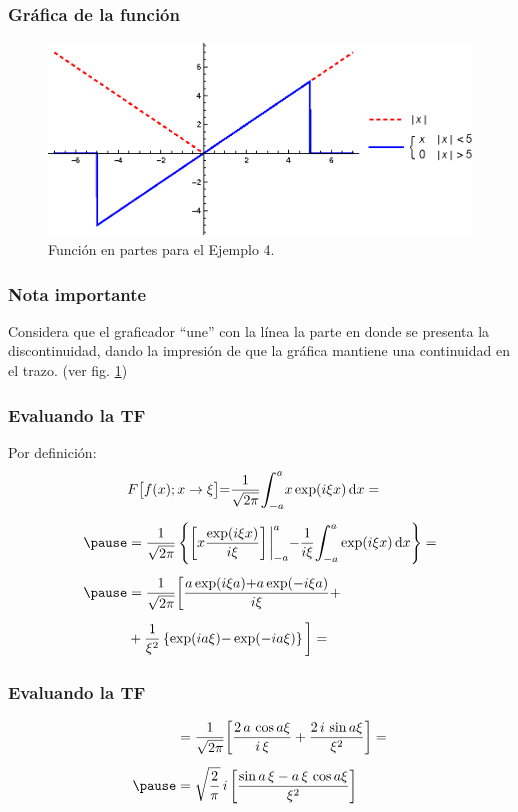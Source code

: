 \begin{frame}
\frametitle{Gráfica de la función}
\begin{figure}[H]
    \centering
    \includegraphics[scale=0.8]{Imagenes/Plot_Ejemplo_04_01.eps}
    \caption{Función en partes para el Ejemplo 4.}
    \label{fig:figura_plot_Ejemplo_04_01}
\end{figure}
\end{frame}
\begin{frame}
\frametitle{Nota importante}
Considera que el graficador \enquote{une} con la línea la parte en donde se presenta la discontinuidad, dando la impresión de que la gráfica mantiene una continuidad en el trazo. (ver fig. \ref{fig:figura_plot_Ejemplo_04_01})
\end{frame}
\begin{frame}
\frametitle{Evaluando la TF}
Por definición:
\pause
\begin{eqnarray*}
\begin{aligned}
&F \big[ f (x); x \to \xi \big] {=} \dfrac{1}{\sqrt{2 \pi}} \scaleint{6ex}_{\bs -a}^{a} x \exp(i \xi x) \dd{x} = \\[0.5em] \pause
&= \dfrac{1}{\sqrt{2 \pi}} \left\{ \bigg[ x \dfrac{\exp(i \xi x)}{i \xi} \bigg] \eval_{-a}^{a} {-} \dfrac{1}{i \xi} \scaleint{6ex}_{\bs -a}^{a} \exp(i \xi x) \dd{x} \right\} = \\[0.5em] \pause
&= \dfrac{1}{\sqrt{2 \pi}} \bigg[ \dfrac{a \exp(i \xi a) {+} a \exp(-i \xi a)}{i \xi} {+} \\[0.5em] 
&+ \dfrac{1}{\xi^{2}} \left\{ \exp(i a \xi) {-} \exp(-i a \xi) \right\} \bigg] =
\end{aligned}
\end{eqnarray*}
\end{frame}
\begin{frame}
\frametitle{Evaluando la TF}
\begin{eqnarray*}
\begin{aligned}
&= \dfrac{1}{\sqrt{2 \pi}} \bigg[ \dfrac{2 \, a \, \cos a \xi}{i \, \xi} + \dfrac{2 \, i \, \sin a \xi}{\xi^{2}} \bigg] = \\[0.5em] \pause
&= \sqrt{\dfrac{2}{\pi}} \, i \, \bigg[ \dfrac{\sin a \, \xi - a \, \xi \, \cos a \xi}{\xi^{2}} \bigg]
\end{aligned}
\end{eqnarray*}
\end{frame}
